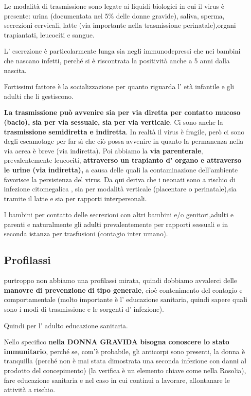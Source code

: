   Le modalità di trasmissione sono legate ai liquidi biologici in cui il
  virus è presente: urina (documentata nel 5\% delle donne gravide),
  saliva, sperma, secrezioni cervicali, latte (via importante nella
  trasmissione perinatale),organi trapiantati, leucociti e sangue.

  L' escrezione è particolarmente lunga sia negli immunodepressi che nei
  bambini che nascano infetti, perché si è riscontrata la positività
  anche a 5 anni dalla nascita.

  Fortissimi fattore è la socializzazione per quanto riguarda l' età
  infantile e gli adulti che li gestiscono.

  \textbf{La trasmissione può avvenire sia per via diretta per contatto
  mucoso (bacio), sia per via sessuale, sia per via verticale}. Ci sono
  anche la \textbf{trasmissione semidiretta e indiretta}. In realtà il
  virus è fragile, però ci sono degli escamotage per far sì che ciò
  possa avvenire in quanto la permanenza nella via aerea è breve (via
  indiretta). Poi abbiamo la \textbf{via parenterale}, prevalentemente
  leucociti, \textbf{attraverso un trapianto d' organo e attraverso le
  urine (via indiretta),} a causa delle quali la contaminazione
  dell'ambiente favorisce la persistenza del virus. Da qui deriva che i
  neonati sono a rischio di infezione citomegalica , sia per modalità
  verticale (placentare o perinatale),sia tramite il latte e sia per
  rapporti interpersonali.

  I bambini per contatto delle secrezioni con altri bambini e/o
  genitori,adulti e parenti e naturalmente gli adulti prevalentemente
  per rapporti sessuali e in seconda istanza per trasfusioni (contagio
  inter umano).

\subsection{Profilassi}
  purtroppo non abbiamo una profilassi mirata, quindi dobbiamo avvalerci
  delle \textbf{manovre di prevenzione} \textbf{di tipo generale}, cioè
  contenimento del contagio e comportamentale (molto importante è l'
  educazione sanitaria, quindi sapere quali sono i modi di trasmissione
  e le sorgenti d' infezione).

  Quindi per l' adulto educazione sanitaria.

  Nello specifico \textbf{nella DONNA GRAVIDA bisogna conoscere lo stato
  immunitario}, perché se, com'è probabile, gli anticorpi sono presenti,
  la donna è tranquilla (perché non è mai stata dimostrata una seconda
  infezione con danni al prodotto del concepimento) (la verifica è un
  elemento chiave come nella Rosolia), fare educazione sanitaria e nel
  caso in cui continui a lavorare, allontanare le attività a rischio.

